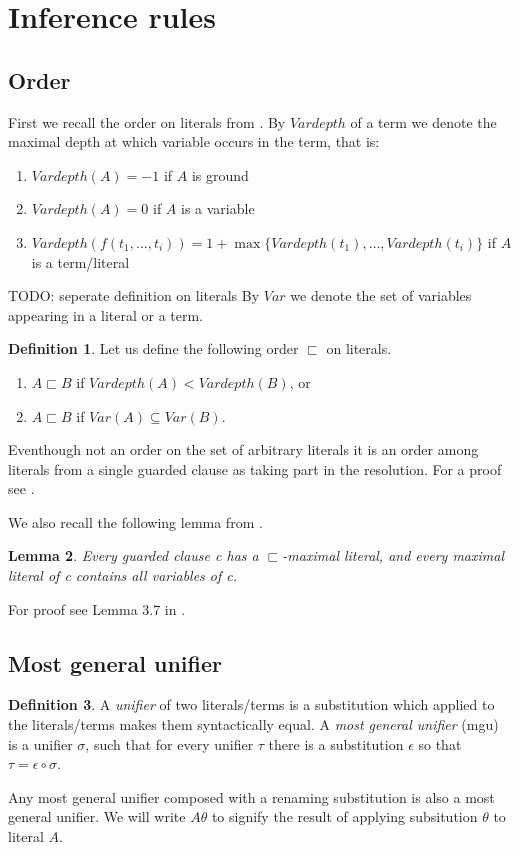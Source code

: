 \documentclass[english, shortabstract]{iithesis}
\theoremstyle{definition} \newtheorem{definition}{Definition}[chapter]
\theoremstyle{remark} \newtheorem{remark}[definition]{Observation}
\theoremstyle{plain} \newtheorem{theorem}[definition]{Theorem}
\theoremstyle{plain} \newtheorem{lemma}[definition]{Lemma}
\begin{document}
\section{Inference rules}\label{section:inference}

\subsection{Order}

First we recall the order on literals from \cite{resolution gf}.
By $Vardepth$ of a term we denote the maximal depth at which variable occurs in the term, that is:
\begin{enumerate}
    \item $Vardepth(A)=-1$ if $A$ is ground
    \item $Vardepth(A)=0$ if $A$ is a variable
    \item $Vardepth(f(t_1,\dots, t_i))=1+\max\{Vardepth(t_1), \dots, Vardepth(t_i)\}$ if $A$ is a term/literal
\end{enumerate}
TODO: seperate definition on literals
By $Var$ we denote the set of variables appearing in a literal or a term.
\begin{definition}\label{def:order}
Let us define the following order $\sqsubset$ on literals.
\begin{enumerate}
    \item $A \sqsubset B$ if $Vardepth(A) < Vardepth(B)$, or
    \item $A \sqsubset B$ if $\mathit{Var}(A) \subseteq Var(B)$.
\end{enumerate}
\end{definition}
Eventhough not an order on the set of arbitrary literals it is an order among literals from a single guarded clause as taking part in the resolution.
For a proof see \cite{resolution gf}.

We also recall the following lemma from \cite{resolution GF}.
\begin{lemma}\label{lem:guarded}
Every guarded clause c has a $\sqsubset$-maximal literal, and every maximal literal
of c contains all variables of c.
\end{lemma}
For proof see Lemma 3.7 in \cite{resolution GF}.

\subsection{Most general unifier}
\begin{definition}\label{def:mgu}
A \emph{unifier} of two literals/terms is a substitution which applied to the literals/terms makes them syntactically equal. 
A \emph{most general unifier} (mgu) is a unifier $\sigma$, such that for every unifier $\tau$ there is a substitution $\epsilon$ so that $\tau=\epsilon\circ\sigma$.
\end{definition}
Any most general unifier composed with a renaming substitution is also a most general unifier.
We will write $A\theta$ to signify the result of applying subsitution $\theta$ to literal $A$.
\end{document}

